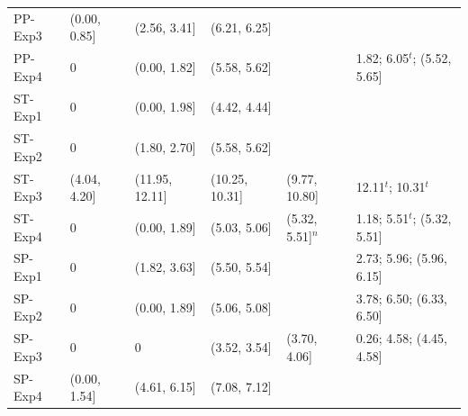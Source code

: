 {\begin{longtable}{p{}p{}p{}p{}p{}p{}}
PP-Exp3 & (0.00, 0.85] & (2.56, 3.41] & (6.21, 6.25] &  &  \\
PP-Exp4 & 0 & (0.00, 1.82] & (5.58, 5.62] &  & 1.82; 6.05$^{t}$; (5.52, 5.65] \\
ST-Exp1 & 0 & (0.00, 1.98] & (4.42, 4.44] &  &  \\
ST-Exp2 & 0 & (1.80, 2.70] & (5.58, 5.62] &  &  \\
ST-Exp3 & (4.04, 4.20] & (11.95, 12.11] & (10.25, 10.31] & (9.77, 10.80] & 12.11$^{t}$; 10.31$^{t}$ \\
ST-Exp4 & 0 & (0.00, 1.89] & (5.03, 5.06] & (5.32, 5.51]$^{n}$ & 1.18; 5.51$^{t}$; (5.32, 5.51] \\
SP-Exp1 & 0 & (1.82, 3.63] & (5.50, 5.54] &  & 2.73; 5.96; (5.96, 6.15] \\
SP-Exp2 & 0 & (0.00, 1.89] & (5.06, 5.08] &  & 3.78; 6.50; (6.33, 6.50] \\
SP-Exp3 & 0 & 0 & (3.52, 3.54] & (3.70, 4.06] & 0.26; 4.58; (4.45, 4.58] \\
SP-Exp4 & (0.00, 1.54] & (4.61, 6.15] & (7.08, 7.12] &  &  \\
\bottomrule
\end{longtable}
}
